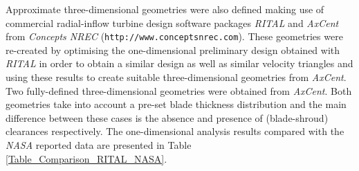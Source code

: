 \documentclass[12pt,a4paper,twoside]{article}
\begin{document}
Approximate three-dimensional geometries were also defined making use of commercial radial-inflow turbine design software packages \textit{RITAL} and \textit{AxCent} from \textit{Concepts NREC} (\texttt{http://www.conceptsnrec.com}). 
These geometries were re-created by optimising the one-dimensional preliminary design obtained with \textit{RITAL} in order to obtain a similar design as well as similar velocity triangles and using these results to create suitable three-dimensional geometries from \textit{AxCent}. 
Two fully-defined three-dimensional geometries were obtained from \textit{AxCent}. Both geometries take into account a pre-set blade thickness distribution and the main difference between these cases is the absence and presence of (blade-shroud) clearances respectively.
The one-dimensional analysis results compared with the \textit{NASA} reported data are presented in Table \ref{Table_Comparison_RITAL_NASA}. 
\end{document}
